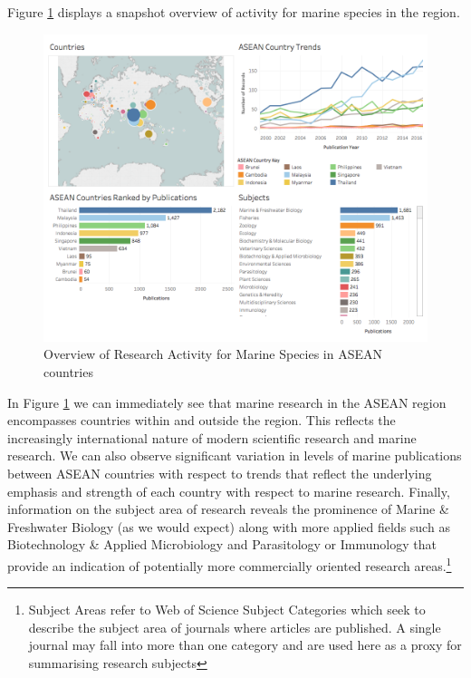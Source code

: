 \documentclass[openany]{book}
\let\rmarkdownfootnote\footnote%
\def\footnote{\protect\rmarkdownfootnote}
\theoremstyle{definition}
\theoremstyle{definition}
\theoremstyle{definition}
\theoremstyle{remark}
\begin{document}
Figure \ref{fig:marineres} displays a snapshot overview of activity for
marine species in the region.

\begin{figure}

{\centering \includegraphics[width=1\linewidth]{images/aseanmarinlit_overview} 

}

\caption{Overview of Research Activity for Marine Species in ASEAN countries}\label{fig:marineres}
\end{figure}

In Figure \ref{fig:marineres} we can immediately see that marine
research in the ASEAN region encompasses countries within and outside
the region. This reflects the increasingly international nature of
modern scientific research and marine research. We can also observe
significant variation in levels of marine publications between ASEAN
countries with respect to trends that reflect the underlying emphasis
and strength of each country with respect to marine research. Finally,
information on the subject area of research reveals the prominence of
Marine \& Freshwater Biology (as we would expect) along with more
applied fields such as Biotechnology \& Applied Microbiology and
Parasitology or Immunology that provide an indication of potentially
more commercially oriented research areas.\footnote{Subject Areas refer
  to Web of Science Subject Categories which seek to describe the
  subject area of journals where articles are published. A single
  journal may fall into more than one category and are used here as a
  proxy for summarising research subjects}
\end{document}
